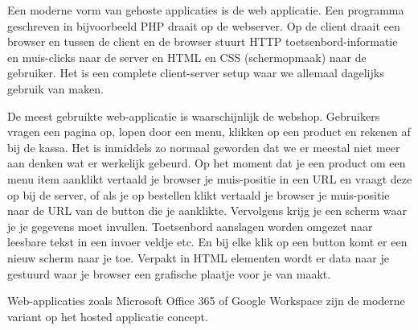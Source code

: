 Een moderne vorm van gehoste applicaties is de web applicatie. Een programma geschreven in bijvoorbeeld PHP draait op de webserver. Op de client draait een browser en tussen de client en de browser stuurt HTTP toetsenbord-informatie  en muis-clicks naar de server en HTML en CSS (schermopmaak) naar de gebruiker. Het is een complete client-server setup waar we allemaal dagelijks gebruik van maken.

De meest gebruikte web-applicatie is waarschijnlijk de webshop. Gebruikers vragen een pagina op, lopen door een menu, klikken op een product en rekenen af bij de kassa. Het is inmiddels zo normaal geworden dat we er meestal niet meer aan denken wat er werkelijk gebeurd. Op het moment dat je een product om een menu item aanklikt vertaald je browser je muis-positie in een URL en vraagt deze op bij de server, of als je op bestellen klikt vertaald je browser je muis-positie naar de URL van de button die je aanklikte. Vervolgens krijg je een scherm waar je je gegevens moet invullen. Toetsenbord aanslagen worden omgezet naar leesbare tekst in een invoer veldje etc. En bij elke klik op een button komt er een nieuw scherm naar je toe. Verpakt in HTML elementen wordt er data naar je gestuurd waar je browser een grafische plaatje voor je van maakt.

Web-applicaties zoals Microsoft Office 365 of Google Workspace zijn de moderne variant op het hosted applicatie concept.
